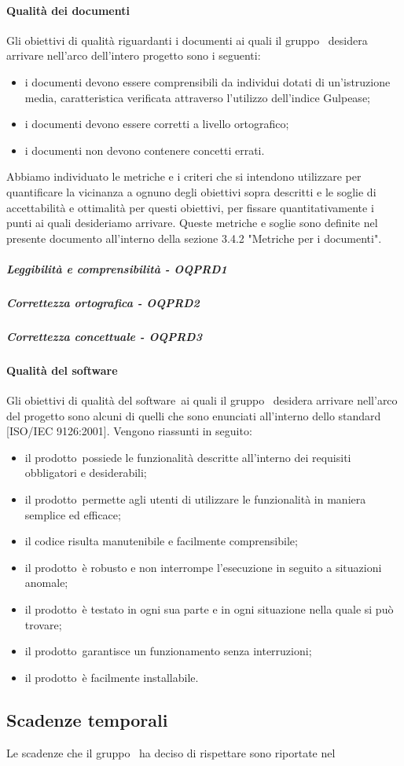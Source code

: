 \documentclass[../PianoDiQualifica.tex]{subfiles}
\begin{document}
			\paragraph{Qualità dei documenti}
			Gli obiettivi di qualità riguardanti i documenti ai quali il gruppo \leaf\ desidera arrivare nell'arco dell'intero progetto sono i seguenti:
			\begin{itemize}
				\item i documenti devono essere comprensibili da individui dotati di un'istruzione media, caratteristica verificata attraverso l'utilizzo dell'indice Gulpease\g;
				\item i documenti devono essere corretti a livello ortografico;
				\item i documenti non devono contenere concetti errati.
			\end{itemize}
			Abbiamo individuato le metriche e i criteri che si intendono utilizzare per quantificare la vicinanza a ognuno degli obiettivi sopra descritti e le soglie di accettabilità e ottimalità per questi obiettivi, per fissare quantitativamente i punti ai quali desideriamo arrivare. Queste metriche e soglie sono definite nel presente documento all'interno della sezione 3.4.2 "Metriche per i documenti".
				
				\subparagraph{Leggibilità e comprensibilità - OQPRD1}
				\subparagraph{Correttezza ortografica - OQPRD2}
				\subparagraph{Correttezza concettuale - OQPRD3}
			
			\paragraph{Qualità del software}
			Gli obiettivi di qualità del software\g\ ai quali il gruppo \leaf\ desidera arrivare nell'arco del progetto sono alcuni di quelli che sono enunciati all'interno dello standard [ISO/IEC 9126:2001]. Vengono riassunti in seguito:
			\begin{itemize}
				\item il prodotto\g\ possiede le funzionalità descritte all'interno dei requisiti obbligatori e desiderabili;
				\item il prodotto\g\ permette agli utenti di utilizzare le funzionalità in maniera semplice ed efficace;
				\item il codice risulta manutenibile e facilmente comprensibile;
				\item il prodotto\g\ è robusto e non interrompe l'esecuzione in seguito a situazioni anomale;
				\item il prodotto\g\ è testato in ogni sua parte e in ogni situazione nella quale si può trovare;
				\item il prodotto\g{}arantisce un funzionamento senza interruzioni;
				\item il prodotto\g\ è facilmente installabile.
			\end{itemize}
	\subsection{Scadenze temporali}
	Le scadenze che il gruppo \leaf\ ha deciso di rispettare sono riportate nel \pianodiprogettov
\end{document}
